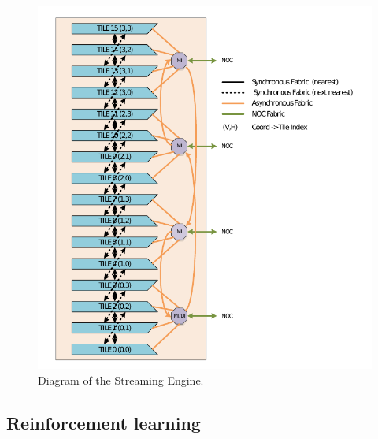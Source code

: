\begin{figure}[h]
    \centering
    \includegraphics[width=\linewidth]{fig/SE_diagram.pdf}
    \caption{Diagram of the Streaming Engine.}
    \label{fig:se_diagram}
  \end{figure}

\subsection{Reinforcement learning}

